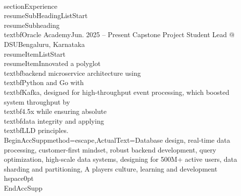 \documentclass[a4paper]{extarticle}
\makeatletter
\renewcommand\normalsize{\fontsize{9}{11}\selectfont}
\newcommand{\resumeItem}[1]{
  \item\normalsize{
    {#1 \vspace{-2pt}}
  }
}
\newcommand{\resumeSubheading}[4]{
  \vspace{-2pt}\item
    \begin{tabular*}{1.0\textwidth}[t]{l@{\extracolsep{\fill}}r}
      \textbf{#1} & \textbf{\small #2} \
      \textit{\small#3} & \textit{\small #4} \
    \end{tabular*}\vspace{-7pt}
}
\newcommand{\resumeSubHeadingListStart}{\begin{itemize}[leftmargin=0.0in, label={}]}
\newcommand{\resumeItemListStart}{\begin{itemize}}
\makeatother
\begin{document}
\\section{Experience}
\\resumeSubHeadingListStart
    \\resumeSubheading
    {\\textbf{Oracle Academy}}{Jun. 2025 -- Present}
    {Capstone Project Student Lead @ DSU}{Bengaluru, Karnataka}
    \\resumeItemListStart
        \\resumeItem{Innovated a polyglot \\textbf{backend} microservice architecture using \\textbf{Python} and Go with \\textbf{Kafka}, designed for high-throughput event processing, which boosted system throughput by \\textbf{4.5x} while ensuring absolute \\textbf{data integrity} and applying \\textbf{LLD} principles.}
        \\BeginAccSupp{method=escape,ActualText={Database design, real-time data processing, customer-first mindset, robust backend development, query optimization, high-scale data systems, designing for 500M+ active users, data sharding and partitioning, A players culture, learning and development}}\\hspace{0pt}\\EndAccSupp{}
\end{document}
